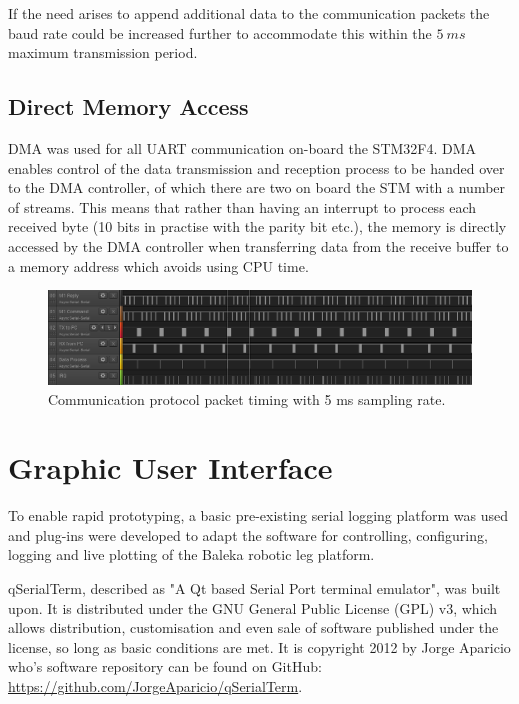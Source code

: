 If the need arises to append additional data to the communication packets the baud rate could be increased further to accommodate this within the $5\ ms$ maximum transmission period.

\subsection{Direct Memory Access}

DMA was used for all UART communication on-board the STM32F4. DMA enables control of the data transmission and reception process to be handed over to the DMA controller, of which there are two on board the STM with a number of streams. This means that rather than having an interrupt to process each received byte (10 bits in practise with the parity bit etc.), the memory is directly accessed by the DMA controller when transferring data from the receive buffer to a memory address which avoids using CPU time.  

\begin{figure}
\centering
\includegraphics[width=1\textwidth]{images/comms/pc-packet-timing-data} 
\caption{Communication protocol packet timing with 5 ms sampling rate.}
\label{fig:packet-timing}
\end{figure}

\section{Graphic User Interface}
\label{chap:Graphic User Interface}

To enable rapid prototyping, a basic pre-existing serial logging platform was used and plug-ins were developed to adapt the software for controlling, configuring, logging and live plotting of the Baleka robotic leg platform. 

qSerialTerm, described as "A Qt based Serial Port terminal emulator", was built upon. It is distributed under the GNU General Public License (GPL) v3, which allows distribution, customisation and even sale of software published under the license, so long as basic conditions are met. It is copyright 2012 by Jorge Aparicio who's software repository can be found on GitHub: \url{https://github.com/JorgeAparicio/qSerialTerm}\cite{jorgeaparicio2013}.

